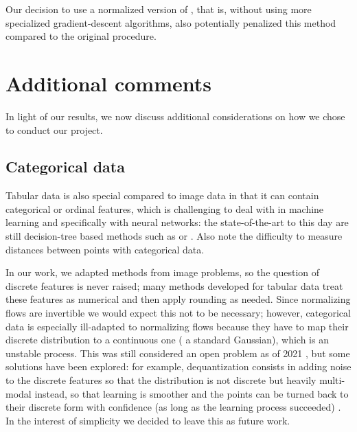 \documentclass[../main.tex]{subfiles}
\begin{document}
Our decision to use a normalized version of \revise{}, that is, without using more specialized gradient-descent algorithms,
also potentially penalized this method compared to the original procedure.


\section{Additional comments}

In light of our results, we now discuss additional considerations on how we chose to conduct our project.

\subsection{Categorical data}

Tabular data is also special compared to image data in that it can contain categorical or ordinal features, which is challenging to deal with in machine learning and specifically with neural networks: the state-of-the-art to this day are still decision-tree based methods such as  \cite{chenXGBoost2016} or  \cite{prokhorenkovaCatBoost2018}.
Also note the difficulty to measure distances between points with categorical data.

In our work, we adapted methods from image problems, so the question of discrete features is never raised; many methods developed for tabular data treat these features as numerical and then apply rounding as needed.
Since normalizing flows are invertible we would expect this not to be necessary; however, categorical data is especially ill-adapted to normalizing flows because they have to map their discrete distribution to a continuous one (\eg{} a standard Gaussian), which is an unstable process.
This was still considered an open problem as of 2021 \cite{kobyzevNormalizing2021}, but some solutions have been explored:
for example, dequantization consists in adding noise to the discrete features so that the distribution is not discrete but heavily multi-modal instead, so that learning is smoother and the points can be turned back to their discrete form with confidence (as long as the learning process succeeded) \cite{hoFlow2019}.
In the interest of simplicity we decided to leave this as future work.

\subsection{\CakeOnSea}
\end{document}

